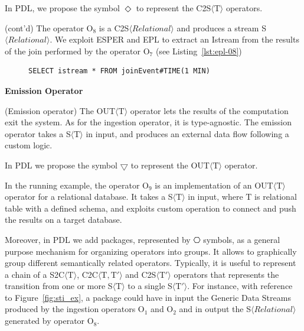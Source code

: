 \noindent
In PDL, we propose the symbol $\Diamond$ to represent the C2S$\langle\mathrm{T}\rangle$ operators. 

\begin{Example}
(cont'd) The operator O$_8$ is a C2S$\langle Relational \rangle$ and produces a stream S$\langle Relational \rangle$. We exploit ESPER and EPL to extract an Istream from the results of the join performed by the operator O$_7$ (see Listing~\ref{lst:epl-08})

\begin{figure}[ht]
\begin{minipage}{0.95\linewidth}
\begin{lstlisting}[caption={EPL query, applied by O$_8$ operator, to create a stream after the join operation.},label=lst:epl-08,style=ESPER]
     SELECT istream * FROM joinEvent#TIME(1 MIN)
\end{lstlisting}
\end{minipage}
\end{figure}
\end{Example}

\pagebreak

\medskip
\noindent
\textbf{Emission Operator}
\medskip

\begin{Definition}
(Emission operator) The OUT$\langle\mathrm{T}\rangle$ operator lets the results of the computation exit the system. As for the ingestion operator, it is type-agnostic. The emission operator takes a S$\langle\mathrm{T}\rangle$ in input, and produces an external data flow following a custom logic.
\end{Definition}

\noindent
In PDL we propose the symbol $\bigtriangledown$ to represent the OUT$\langle\mathrm{T}\rangle$ operator. 

In the running example, the operator O$_9$ is an implementation of an OUT$\langle\mathrm{T}\rangle$ operator for a relational database. It takes a S$\langle\mathrm{T}\rangle$ in input, where $\mathrm{T}$ is relational table with a defined schema, and exploits custom operation to connect and push the results on a target database. 

Moreover, in PDL we add packages, represented by $\hexagon$ symbols, as a general purpose mechanism for organizing \river{} operators into groups. It allows to graphically group different semantically related operators.
Typically, it is useful to represent a chain of a S2C$\langle\mathrm{T}\rangle$, C2C$\langle\mathrm{T},\mathrm{T}'\rangle$ and C2S$\langle\mathrm{T}'\rangle$ operators that represents the transition from one or more S$\langle\mathrm{T}\rangle$ to a single S$\langle\mathrm{T}'\rangle$.
For instance, with reference to Figure~\ref{fig:sti_ex}, a package could have in input the Generic Data Streams produced by the ingestion operators O$_1$ and O$_2$ and in output the S$\langle Relational \rangle$ generated by operator O$_8$.

